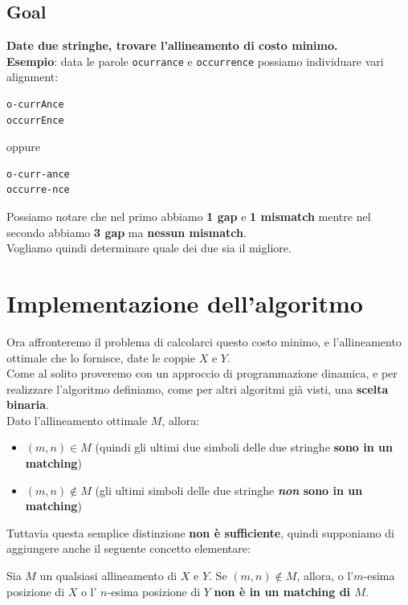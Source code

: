 \subsection{Goal}

\textbf{Date due stringhe, trovare l'allineamento di costo minimo.}\\

\textbf{Esempio}: data le parole \texttt{ocurrance} e
\texttt{occurrence} possiamo individuare vari alignment:

\begin{verbatim}
o-currAnce
occurrEnce
\end{verbatim}

oppure

\begin{verbatim}
o-curr-ance
occurre-nce
\end{verbatim}

Possiamo notare che nel primo abbiamo \textbf{1 gap} e \textbf{1
	mismatch} mentre nel secondo abbiamo \textbf{3 gap} ma \textbf{nessun
	mismatch}.\\

Vogliamo quindi determinare quale dei due sia il migliore.

\section{Implementazione dell'algoritmo}

Ora affronteremo il problema di calcolarci questo costo minimo, e
l'allineamento ottimale che lo fornisce, date le coppie $X$ e $Y$.\\
Come al solito proveremo con un approccio di programmazione dinamica, e
per realizzare l'algoritmo definiamo, come per altri algoritmi già
visti, una \textbf{scelta binaria}.\\ Dato l'allineamento ottimale $M$,
allora:
\begin{itemize}
	\item $(m,n) \in M$ (quindi gli ultimi due simboli delle due
	      stringhe \textbf{sono in un matching})
	\item $(m,n) \notin M$ (gli ultimi
	      simboli delle due stringhe \textbf{\emph{non} sono in un matching})
\end{itemize}

Tuttavia questa semplice distinzione \textbf{non è sufficiente}, quindi
supponiamo di aggiungere anche il seguente concetto elementare:
\begin{myblockquote}
	Sia $M$ un qualsiasi allineamento di $X$ e $Y$. Se $(m,n) \notin M$, allora,
	o l'$m$-esima posizione di $X$ o l' $n$-esima posizione di $Y$ \textbf{non è
		in un matching di $M$}.
\end{myblockquote}


